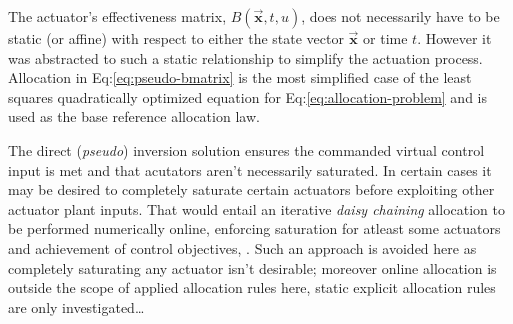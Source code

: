 \par
The actuator's effectiveness matrix, $B(\vec{\mathbf{x}},t,u)$, does not necessarily have to be static (or affine) with respect to either the state vector $\vec{\mathbf{x}}$ or time $t$. However it was abstracted to such a static relationship to simplify the actuation process. Allocation in Eq:\ref{eq:pseudo-bmatrix} is the most simplified case of the least squares quadratically optimized equation for Eq:\ref{eq:allocation-problem} and is used as the base reference allocation law.
\par
The direct (\emph{pseudo}) inversion solution ensures the commanded virtual control input is met and that acutators aren't necessarily saturated. In certain cases it may be desired to completely saturate certain actuators before exploiting other actuator plant inputs. That would entail an iterative \emph{daisy chaining} allocation to be performed numerically online, enforcing saturation for atleast some actuators and achievement of control objectives, \cite{allocation}. Such an approach is avoided here as completely saturating any actuator isn't desirable; moreover online allocation is outside the scope of applied allocation rules here, static explicit allocation rules are only investigated\ldots
